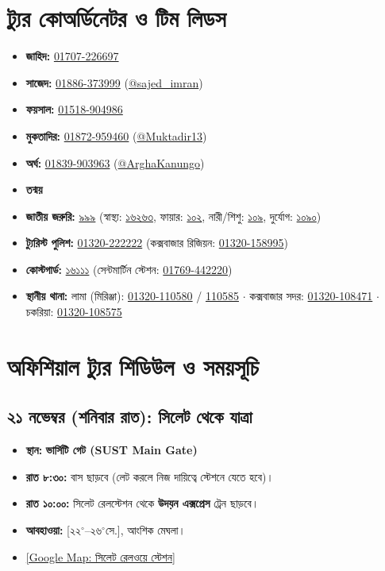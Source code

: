 \documentclass[11pt]{article}
\begin{document}
\vspace{1mm}
\section*{ট্যুর কোঅর্ডিনেটর ও টিম লিডস}
\small
\begin{itemize}
    \item \textbf{জাহিদ:} \href{tel:01707226697}{01707-226697}
    \item \textbf{সাজেদ:} \href{tel:+8801886373999}{01886-373999} \quad (\href{https://t.me/sajed_imran}{@sajed\_imran})
    \item \textbf{ফয়সাল:} \href{tel:01518904986}{01518-904986}
    \item \textbf{মুকতাদির:} \href{tel:+8801872959460}{01872-959460} \quad (\href{https://t.me/Muktadir13}{@Muktadir13})
    \item \textbf{অর্ঘ:} \href{tel:+8801839903963}{01839-903963} \quad (\href{https://t.me/ArghaKanungo}{@ArghaKanungo})
    \item \textbf{তন্ময়}
    \item \textbf{জাতীয় জরুরি:} \href{tel:999}{৯৯৯} (স্বাস্থ্য: \href{tel:16263}{১৬২৬৩}, ফায়ার: \href{tel:102}{১০২}, নারী/শিশু: \href{tel:109}{১০৯}, দুর্যোগ: \href{tel:1090}{১০৯০})
    \item \textbf{ট্যুরিস্ট পুলিশ:} \href{tel:+8801320222222}{01320-222222} (কক্সবাজার রিজিয়ন: \href{tel:+8801320158995}{01320-158995})
    \item \textbf{কোস্টগার্ড:} \href{tel:16111}{১৬১১১} (সেন্টমার্টিন স্টেশন: \href{tel:+8801769442220}{01769-442220})
    \item \textbf{স্থানীয় থানা:} লামা (মিরিঞ্জা): \href{tel:+8801320110580}{01320-110580} / \href{tel:+8801320110585}{110585} $\cdot$ কক্সবাজার সদর: \href{tel:+8801320108471}{01320-108471} $\cdot$ চকরিয়া: \href{tel:+8801320108575}{01320-108575}
\end{itemize}

\newpage

\section*{অফিশিয়াল ট্যুর শিডিউল ও সময়সূচি}

\subsection*{২১ নভেম্বর (শনিবার রাত): সিলেট থেকে যাত্রা}
\begin{itemize}
    \item \textbf{স্থান:} \textbf{ভার্সিটি গেট (SUST Main Gate)}
    \item \textbf{রাত ৮:৩০:} বাস ছাড়বে (লেট করলে নিজ দায়িত্বে স্টেশনে যেতে হবে)।
    \item \textbf{রাত ১০:০০:} সিলেট রেলস্টেশন থেকে \textbf{উদয়ন এক্সপ্রেস} ট্রেন ছাড়বে।
    \item \textbf{আবহাওয়া:} [২২$^\circ$--২৬$^\circ$সে.], আংশিক মেঘলা।
    \item \href{https://maps.google.com/?q=Sylhet+Railway+Station}{\color{primary}[Google Map: সিলেট রেলওয়ে স্টেশন]}
\end{itemize}
\end{document}
